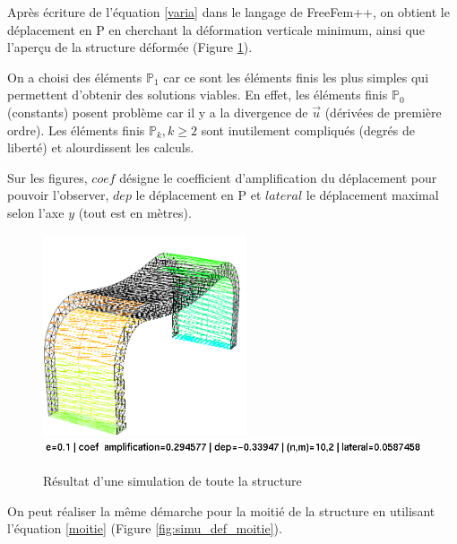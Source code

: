     Après écriture de l'équation \ref{varia} dans le langage de FreeFem++, on obtient le déplacement en P en cherchant la déformation verticale minimum, ainsi que 
    l'aperçu de la structure déformée (Figure \ref{fig:simu_def}).

    On a choisi des éléments $\mathbb{P}_1$ car ce sont les éléments finis les plus simples qui permettent d'obtenir des solutions viables.
    En effet, les éléments finis $\mathbb{P}_0$ (constants) posent problème car il y a la divergence de $\vec{u}$ (dérivées de première ordre).
    Les éléments finis $\mathbb{P}_k, k \geq 2$ sont inutilement compliqués (degrés de liberté) et alourdissent les calculs.

    Sur les figures, $coef$ désigne le coefficient d'amplification du déplacement pour pouvoir l'observer, $dep$ le déplacement en P et $lateral$ 
    le déplacement maximal selon l'axe $y$ (tout est en mètres).
    
    \begin{figure}        
        \begin{center}
        
            \includegraphics[width=6cm]{imgs/all_simu.PNG}
            \includegraphics[width=12cm]{imgs/all_simu_label.PNG}
            \caption{Résultat d'une simulation de toute la structure}
            \label{fig:simu_def}
        
        \end{center}
    \end{figure}

    On peut réaliser la même démarche pour la moitié de la structure en utilisant l'équation \ref{moitie} (Figure \ref{fig:simu_def_moitie}).

